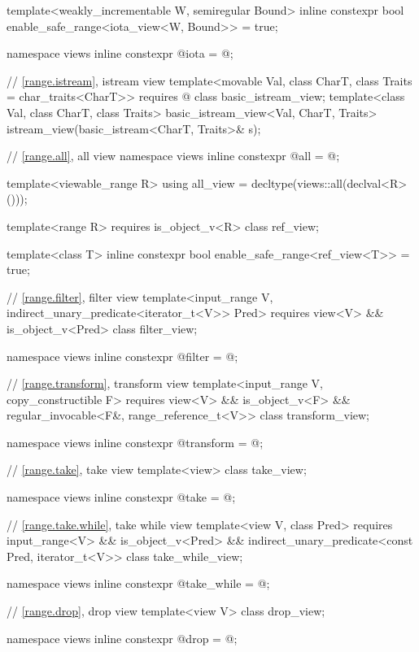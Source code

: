 \begin{codeblock}
{  template<weakly_incrementable W, semiregular Bound>
    inline constexpr bool enable_safe_range<iota_view<W, Bound>> = true;

  namespace views { inline constexpr @\unspec@ iota = @\unspec@; }

  // \ref{range.istream}, istream view
  template<movable Val, class CharT, class Traits = char_traits<CharT>>
    requires @\seebelow@
  class basic_istream_view;
  template<class Val, class CharT, class Traits>
    basic_istream_view<Val, CharT, Traits> istream_view(basic_istream<CharT, Traits>& s);

  // \ref{range.all}, all view
  namespace views { inline constexpr @\unspec@ all = @\unspec@; }

  template<viewable_range R>
    using all_view = decltype(views::all(declval<R>()));

  template<range R>
    requires is_object_v<R>
  class ref_view;

  template<class T>
    inline constexpr bool enable_safe_range<ref_view<T>> = true;

  // \ref{range.filter}, filter view
  template<input_range V, indirect_unary_predicate<iterator_t<V>> Pred>
    requires view<V> && is_object_v<Pred>
  class filter_view;

  namespace views { inline constexpr @\unspec@ filter = @\unspec@; }

  // \ref{range.transform}, transform view
  template<input_range V, copy_constructible F>
    requires view<V> && is_object_v<F> &&
             regular_invocable<F&, range_reference_t<V>>
  class transform_view;

  namespace views { inline constexpr @\unspec@ transform = @\unspec@; }

  // \ref{range.take}, take view
  template<view> class take_view;

  namespace views { inline constexpr @\unspec@ take = @\unspec@; }

  // \ref{range.take.while}, take while view
  template<view V, class Pred>
    requires input_range<V> && is_object_v<Pred> &&
      indirect_unary_predicate<const Pred, iterator_t<V>>
    class take_while_view;

  namespace views { inline constexpr @\unspec@ take_while = @\unspec@; }

  // \ref{range.drop}, drop view
  template<view V>
    class drop_view;

  namespace views { inline constexpr @\unspec@ drop = @\unspec@; }

}
\end{codeblock}
